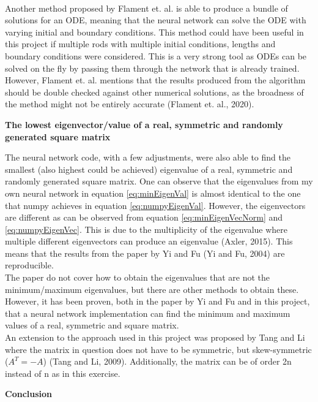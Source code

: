 \documentclass[12pt,a4paper]{article}
\begin{document}
\\
Another method proposed by Flament et. al. is able to produce a bundle of solutions for an ODE, meaning that the neural network can solve the ODE with varying initial and boundary conditions. This method could have been useful in this project if multiple rods with multiple initial conditions, lengths and boundary conditions were considered. This is a very strong tool as ODEs can be solved on the fly by passing them through the network that is already trained. However, Flament et. al. mentions that the results produced from the algorithm should be double checked against other numerical solutions, as the broadness of the method might not be entirely accurate (Flament et. al., 2020). 

\begin{center}
\large{\textbf{The lowest eigenvector/value of a real, symmetric and randomly generated square matrix}}
\end{center}

\noindent The neural network code, with a few adjustments, were also able to find the smallest (also highest could be achieved) eigenvalue of a real, symmetric and randomly generated square matrix. One can observe that the eigenvalues from my own neural network in equation \ref{eq:minEigenVal} is almost identical to the one that numpy achieves in equation \ref{eq:numpyEigenVal}. However, the eigenvectors are different as can be observed from equation \ref{eq:minEigenVecNorm} and \ref{eq:numpyEigenVec}. This is due to the multiplicity of the eigenvalue where multiple different eigenvectors can produce an eigenvalue (Axler, 2015). This means that the results from the paper by Yi and Fu (Yi and Fu, 2004) are reproducible. 
\\
The paper do not cover how to obtain the eigenvalues that are not the minimum/maximum eigenvalues, but there are other methods to obtain these. However, it has been proven, both in the paper by Yi and Fu and in this project, that a neural network implementation can find the minimum and maximum values of a real, symmetric and square matrix.
\\
An extension to the approach used in this project was proposed by Tang and Li where the matrix in question does not have to be symmetric, but skew-symmetric ($A^T = -A$) (Tang and Li, 2009). Additionally, the matrix can be of order 2n instead of n as in this exercise. 

\newpage

\begin{center}
\Large{\textbf{Conclusion}}
\end{center}
\end{document}
